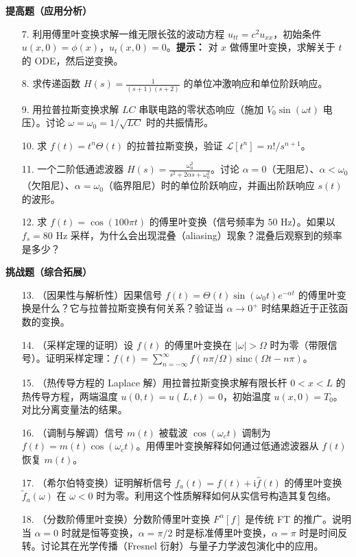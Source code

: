 \textbf{提高题（应用分析）}

\begin{enumerate}
\item[7.] 利用傅里叶变换求解一维无限长弦的波动方程 $u_{tt} = c^2 u_{xx}$，初始条件 $u(x,0)=\phi(x)$，$u_t(x,0)=0$。\textbf{提示：} 对 $x$ 做傅里叶变换，求解关于 $t$ 的 ODE，然后逆变换。
\item[8.] 求传递函数 $H(s) = \frac{1}{(s+1)(s+2)}$ 的单位冲激响应和单位阶跃响应。
\item[9.] 用拉普拉斯变换求解 $LC$ 串联电路的零状态响应（施加 $V_0\sin(\omega t)$ 电压）。讨论 $\omega = \omega_0 = 1/\sqrt{LC}$ 时的共振情形。
\item[10.] 求 $f(t) = t^n\Theta(t)$ 的拉普拉斯变换，验证 $\mathcal{L}[t^n] = n!/s^{n+1}$。
\item[11.] 一个二阶低通滤波器 $H(s) = \frac{\omega_0^2}{s^2 + 2\alpha s + \omega_0^2}$。讨论 $\alpha=0$（无阻尼）、$\alpha<\omega_0$（欠阻尼）、$\alpha=\omega_0$（临界阻尼）时的单位阶跃响应，并画出阶跃响应 $s(t)$ 的波形。
\item[12.] 求 $f(t) = \cos(100\pi t)$ 的傅里叶变换（信号频率为 $50$ Hz）。如果以 $f_s=80$ Hz 采样，为什么会出现混叠（aliasing）现象？混叠后观察到的频率是多少？
\end{enumerate}

\textbf{挑战题（综合拓展）}

\begin{enumerate}
\item[13.]（因果性与解析性）因果信号 $f(t)=\Theta(t)\sin(\omega_0 t)e^{-\alpha t}$ 的傅里叶变换是什么？它与拉普拉斯变换有何关系？验证当 $\alpha\to0^+$ 时结果趋近于正弦函数的变换。
\item[14.]（采样定理的证明）设 $f(t)$ 的傅里叶变换在 $|\omega|>\Omega$ 时为零（带限信号）。证明采样定理：$f(t) = \sum_{n=-\infty}^{\infty} f(n\pi/\Omega)\,\mathrm{sinc}(\Omega t - n\pi)$。
\item[15.]（热传导方程的 Laplace 解）用拉普拉斯变换求解有限长杆 $0<x<L$ 的热传导方程，两端温度 $u(0,t)=u(L,t)=0$，初始温度 $u(x,0)=T_0$。对比分离变量法的结果。
\item[16.]（调制与解调）信号 $m(t)$ 被载波 $\cos(\omega_c t)$ 调制为 $f(t)=m(t)\cos(\omega_c t)$。用傅里叶变换解释如何通过低通滤波器从 $f(t)$ 恢复 $m(t)$。
\item[17.]（希尔伯特变换）证明解析信号 $f_a(t) = f(t) + \mathrm{i}\hat{f}(t)$ 的傅里叶变换 $\tilde{f}_a(\omega)$ 在 $\omega<0$ 时为零。利用这个性质解释如何从实信号构造其复包络。
\item[18.]（分数阶傅里叶变换）分数阶傅里叶变换 $F^{\alpha}[f]$ 是传统 FT 的推广。说明当 $\alpha=0$ 时就是恒等变换，$\alpha=\pi/2$ 时是标准傅里叶变换，$\alpha=\pi$ 时是时间反转。讨论其在光学传播（Fresnel 衍射）与量子力学波包演化中的应用。
\end{enumerate}
